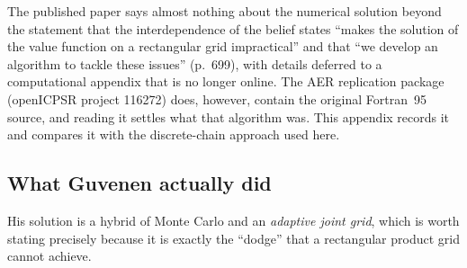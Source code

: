 \documentclass[11pt,fleqn]{article}
\begin{document}
The published paper says almost nothing about the numerical solution beyond the
statement that the interdependence of the belief states ``makes the solution of the
value function on a rectangular grid impractical'' and that ``we develop an algorithm
to tackle these issues'' (p.~699), with details deferred to a computational appendix
that is no longer online. The AER replication package (openICPSR project 116272)
does, however, contain the original Fortran~95 source, and reading it settles what
that algorithm was. This appendix records it and compares it with the discrete-chain
approach used here.

\subsection{What Guvenen actually did}
\label{app:guvenen}

His solution is a hybrid of Monte Carlo and an \emph{adaptive joint grid}, which
is worth stating precisely because it is exactly the ``dodge'' that a rectangular
product grid cannot achieve.
\end{document}

